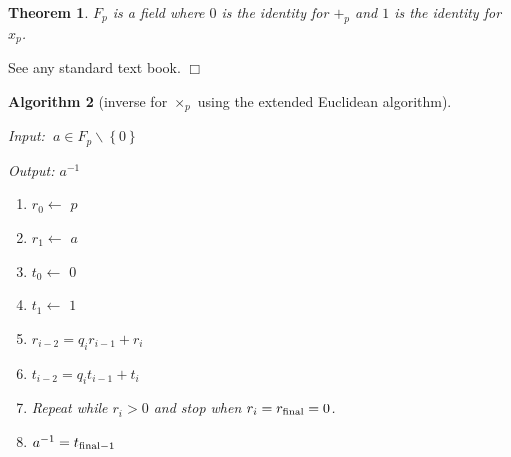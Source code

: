 \documentclass{article}%
\newtheorem{theorem}{Theorem}
\newtheorem{algorithm}[theorem]{Algorithm}
\newenvironment{proof}{\noindent{\em Proof:}}{$\Box$~\\}
\begin{document}
\begin{theorem}
$F_{p}$ is a field where $0$ is the identity for $+_{p}$ and $1$ is the
identity for $x_{p}$.
\end{theorem}

\begin{proof}
See any standard text book.
\end{proof}

\begin{algorithm}
[inverse for $\times_{p}$ using the extended Euclidean algorithm]\ 

\noindent Input: $\ a\in F_{p}\backslash\left\{  0\right\}  $

\noindent Output: $a^{-1}$

\begin{enumerate}
\item $r_0 \leftarrow$ $p$
\item $r_1 \leftarrow$ $a$
\item $t_0 \leftarrow$ $0$
\item $t_1 \leftarrow$ $1$
\item $r_{i-2}=q_i r_{i-1} + r_i$
\item $t_{i-2}=q_i t_{i-1} + t_i$
\item Repeat while $r_i>0$ and stop when $r_i=r_{\textnormal{final}}=0$.
\item $a^{-1}=t_{\textnormal{final}-1}$
\end{enumerate}
\end{algorithm}
\end{document}
